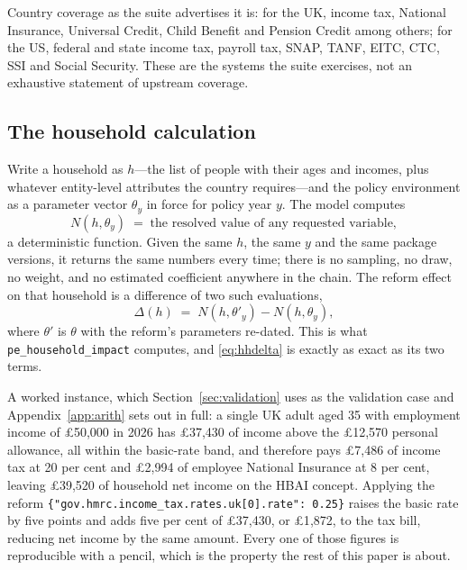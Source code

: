 Country coverage as the suite advertises it is: for the UK, income tax, National Insurance, Universal Credit, Child Benefit and Pension Credit among others; for the US, federal and state income tax, payroll tax, SNAP, TANF, EITC, CTC, SSI and Social Security. These are the systems the suite exercises, not an exhaustive statement of upstream coverage.

\subsection{The household calculation}
\label{sec:hhcalc}

Write a household as $h$---the list of people with their ages and incomes, plus whatever entity-level attributes the country requires---and the policy environment as a parameter vector $\theta_y$ in force for policy year $y$. The model computes
\[
  N(h, \theta_y) \;=\; \text{the resolved value of any requested variable},
\]
a deterministic function. Given the same $h$, the same $y$ and the same package versions, it returns the same numbers every time; there is no sampling, no draw, no weight, and no estimated coefficient anywhere in the chain. The reform effect on that household is a difference of two such evaluations,
\begin{equation}
  \Delta(h) \;=\; N(h, \theta'_y) - N(h, \theta_y),
  \label{eq:hhdelta}
\end{equation}
where $\theta'$ is $\theta$ with the reform's parameters re-dated. This is what \texttt{pe\_household\_impact} computes, and \eqref{eq:hhdelta} is exactly as exact as its two terms.

A worked instance, which Section~\ref{sec:validation} uses as the validation case and Appendix~\ref{app:arith} sets out in full: a single UK adult aged 35 with employment income of \pounds 50{,}000 in 2026 has \pounds 37{,}430 of income above the \pounds 12{,}570 personal allowance, all within the basic-rate band, and therefore pays \pounds 7{,}486 of income tax at 20 per cent and \pounds 2{,}994 of employee National Insurance at 8 per cent, leaving \pounds 39{,}520 of household net income on the HBAI concept. Applying the reform \texttt{\{"gov.hmrc.\allowbreak income\_tax.\allowbreak rates.\allowbreak uk[0].\allowbreak rate": 0.25\}} raises the basic rate by five points and adds five per cent of \pounds 37{,}430, or \pounds 1{,}872, to the tax bill, reducing net income by the same amount. Every one of those figures is reproducible with a pencil, which is the property the rest of this paper is about.

